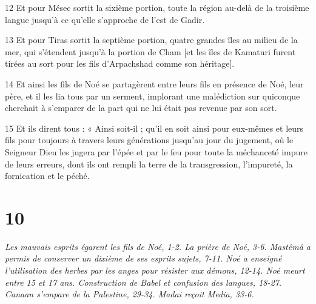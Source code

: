 \par 12 Et pour Mésec sortit la sixième portion, toute la région au-delà de la troisième langue jusqu'à ce qu'elle s'approche de l'est de Gadir.
\par 13 Et pour Tiras sortit la septième portion, quatre grandes îles au milieu de la mer, qui s'étendent jusqu'à la portion de Cham [et les îles de Kamaturi furent tirées au sort pour les fils d'Arpachshad comme son héritage].
\par 14 Et ainsi les fils de Noé se partagèrent entre leurs fils en présence de Noé, leur père, et il les lia tous par un serment, implorant une malédiction sur quiconque cherchait à s'emparer de la part qui ne lui était pas revenue par son sort.
\par 15 Et ils dirent tous : « Ainsi soit-il ; qu'il en soit ainsi pour eux-mêmes et leurs fils pour toujours à travers leurs générations jusqu'au jour du jugement, où le Seigneur Dieu les jugera par l'épée et par le feu pour toute la méchanceté impure de leurs erreurs, dont ils ont rempli la terre de la transgression, l'impureté, la fornication et le péché.

\chapter{10}

\par \textit{Les mauvais esprits égarent les fils de Noé, 1-2. La prière de Noé, 3-6. Mastêmâ a permis de conserver un dixième de ses esprits sujets, 7-11. Noé a enseigné l'utilisation des herbes par les anges pour résister aux démons, 12-14. Noé meurt entre 15 et 17 ans. Construction de Babel et confusion des langues, 18-27. Canaan s'empare de la Palestine, 29-34. Madai reçoit Media, 33-6.}


